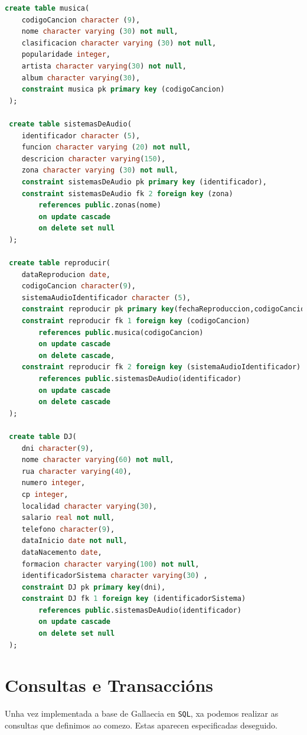 \documentclass[12pt,a4paper]{book}
\theoremstyle{definition}
\theoremstyle{break}
\begin{document}
\begin{lstlisting}[language=sql,style=sql,tabsize=5,  escapechar={|},
	keywordstyle=\color{blue}\ttfamily,
	stringstyle=\color{red}\ttfamily]
 create table musica(
 	codigoCancion character (9),
 	nome character varying (30) not null,
 	clasificacion character varying (30) not null,
 	popularidade integer,
 	artista character varying(30) not null,
 	album character varying(30),
 	constraint musica pk primary key (codigoCancion)
 );
 
 create table sistemasDeAudio(
 	identificador character (5),
 	funcion character varying (20) not null,
 	descricion character varying(150),
 	zona character varying (30) not null,
 	constraint sistemasDeAudio pk primary key (identificador),
 	constraint sistemasDeAudio fk 2 foreign key (zona)
 		references public.zonas(nome)
 		on update cascade
 		on delete set null
 );
 
 create table reproducir(
 	dataReproducion date,
 	codigoCancion character(9),
 	sistemaAudioIdentificador character (5),
 	constraint reproducir pk primary key(fechaReproduccion,codigoCancion, sistemaAudioIdentificador),
 	constraint reproducir fk 1 foreign key (codigoCancion)
 		references public.musica(codigoCancion)
 		on update cascade
 		on delete cascade,
 	constraint reproducir fk 2 foreign key (sistemaAudioIdentificador)
 		references public.sistemasDeAudio(identificador)
 		on update cascade
 		on delete cascade
 );
 
 create table DJ(
 	dni character(9),
 	nome character varying(60) not null,
 	rua character varying(40),
 	numero integer,
 	cp integer,
 	localidad character varying(30),
 	salario real not null,
 	telefono character(9),
 	dataInicio date not null,
 	dataNacemento date,
 	formacion character varying(100) not null,
 	identificadorSistema character varying(30) ,
 	constraint DJ pk primary key(dni),
 	constraint DJ fk 1 foreign key (identificadorSistema)
 		references public.sistemasDeAudio(identificador)
 		on update cascade
 		on delete set null
 );
\end{lstlisting}

\section{Consultas e Transaccións}
Unha vez implementada a base de {\logo Gallaecia} en \texttt{SQL}, xa podemos realizar as consultas que definimos ao comezo. Estas aparecen especificadas deseguido.
\end{document}
